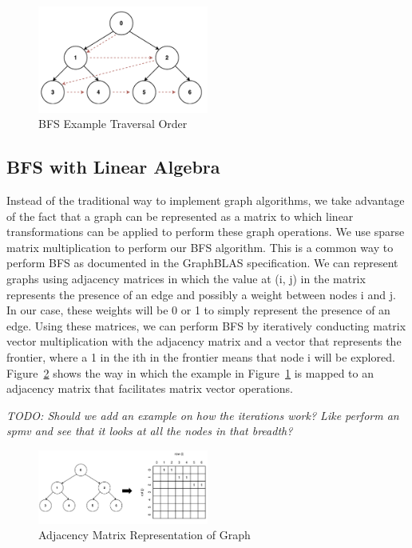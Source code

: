 \documentclass[10pt]{article}
\begin{document}
\begin{figure}[h!]
  \centering
  \includegraphics[width=0.5\textwidth]{bfs_graph.png}
  \caption{BFS Example Traversal Order}
  \label{fig:bfs_graph}
\end{figure}

\subsection{BFS with Linear Algebra}
Instead of the traditional way to implement graph algorithms, we take advantage of the fact that a graph can 
be represented as a matrix to which linear transformations can be applied to perform these graph operations.
We use sparse matrix multiplication to perform our BFS algorithm. This is a common way to perform BFS as documented
in the GraphBLAS specification. We can represent graphs using adjacency matrices in which the value at (i, j) in the 
matrix represents the presence of an edge and possibly a weight between nodes i and j. In our case, these weights will
be 0 or 1 to simply represent the presence of an edge. Using these matrices, we can perform BFS by iteratively conducting 
matrix vector multiplication with the adjacency matrix and a vector that represents the frontier, where a 1 in the ith 
in the frontier means that node i will be explored. Figure~\ref{fig:adj_matrix} shows the way in which the example in 
Figure~\ref{fig:bfs_graph} is mapped to an adjacency matrix that facilitates matrix vector operations. \newline

\textit{TODO: Should we add an example on how the iterations work? Like perform an spmv and see that it looks at all the 
nodes in that breadth?}

\begin{figure}[h!]
  \centering
  \includegraphics[width=0.5\textwidth]{adj_matrix.png}
  \caption{Adjacency Matrix Representation of Graph}
  \label{fig:adj_matrix}
\end{figure}
\end{document}
